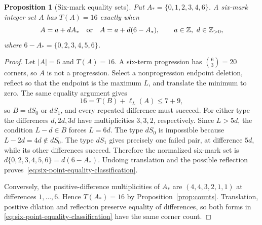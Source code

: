 \documentclass[11pt,a4paper]{article}
\newtheorem{proposition}[theorem]{Proposition}
\theoremstyle{definition}
\newcommand{\Z}{\mathbb Z}
\numberwithin{equation}{section}
\begin{document}
\begin{proposition}[Six-mark equality sets]\label{prop:six-mark-classification}
Put $A_*=\{0,1,2,3,4,6\}$. A six-mark integer set $A$ has $T(A)=16$
exactly when
\begin{equation}\label{eq:six-point-equality-classification}
A=a+dA_*\quad\hbox{or}\quad A=a+d(6-A_*),
\qquad a\in\Z,\ d\in\Z_{>0},
\end{equation}
where $6-A_*=\{0,2,3,4,5,6\}$.
\end{proposition}
\begin{proof}
Let $|A|=6$ and $T(A)=16$. A six-term progression has $\binom63=20$ corners, so $A$ is not a progression. Select a nonprogression endpoint deletion, reflect so that the endpoint is the maximum $L$, and translate the minimum to zero. The same equality argument gives
\[
16=T(B)+\ell_L(A)\le7+9,
\]
so $B=dS_0$ or $dS_1$, and every repeated difference must succeed. For either type the differences $d,2d,3d$ have multiplicities $3,3,2$, respectively. Since $L>5d$, the condition $L-d\in B$ forces $L=6d$. The type $dS_0$ is impossible because $L-2d=4d\notin dS_0$. The type $dS_1$ gives precisely one failed pair, at difference $5d$, while its other differences succeed. Therefore the normalized six-mark set is
$d\{0,2,3,4,5,6\}=d(6-A_*)$. Undoing translation and the possible reflection proves~\eqref{eq:six-point-equality-classification}. 


Conversely, the positive-difference multiplicities of $A_*$ are
$(4,4,3,2,1,1)$ at differences $1,\ldots,6$. Hence $T(A_*)=16$ by
Proposition~\ref{prop:counts}. Translation, positive dilation and reflection
preserve equality of differences, so both forms in
\eqref{eq:six-point-equality-classification} have the same corner count.
\end{proof}
\end{document}

